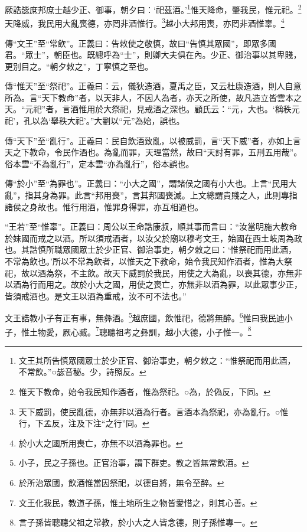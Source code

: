 厥誥毖庶邦庶士越少正、御事，朝夕曰：‘祀茲酒。’\footnote{文王其所告慎眾國眾士於少正官、御治事吏，朝夕敕之：“惟祭祀而用此酒，不常飲。”○毖音秘。少，詩照反。}惟天降命，肇我民，惟元祀。\footnote{惟天下教命，始令我民知作酒者，惟為祭祀。○為，於偽反，下同。}天降威，我民用大亂喪德，亦罔非酒惟行。\footnote{天下威罰，使民亂德，亦無非以酒為行者。言酒本為祭祀，亦為亂行。○惟行，下孟反，注及下注“之行”同。}越小大邦用喪，亦罔非酒惟辜。\footnote{於小大之國所用喪亡，亦無不以酒為罪也。}

{\noindent\zhuan{}\fzbyks 傳“文王”至“常飲”。正義曰：告敕使之敬慎，故曰“告慎其眾國”，即眾多國君。“眾士”，朝臣也。既總呼為“士”，則卿大夫俱在內。少正、御治事以其卑賤，更別目之。“朝夕敕之”，丁寧慎之至也。 \par}

{\noindent\zhuan{}\fzbyks 傳“惟天”至“祭祀”。正義曰：云，儀狄造酒，夏禹之臣，又云杜康造酒，則人自意所為。言“天下教命”者，以天非人，不因人為者，亦天之所使，故凡造立皆雲本之天。“元祀”者，言酒惟用於大祭祀，見戒酒之深也。顧氏云：“元，大也。‘稱秩元祀’，孔以為‘舉秩大祀’。”大劉以“元”為始，誤也。 \par}

{\noindent\zhuan{}\fzbyks 傳“天下”至“亂行”。正義曰：民自飲酒致亂，以被威罰，言“天下威”者，亦如上言天之下教命，令民作酒也。為亂而罪，天理當然，故曰“天討有罪，五刑五用哉”。俗本雲“不為亂行”，定本雲“亦為亂行”，俗本誤也。 \par}

{\noindent\zhuan{}\fzbyks 傳“於小”至“為罪也”。正義曰：“小大之國”，謂諸侯之國有小大也。上言“民用大亂”，指其身為罪。此言“邦用喪”，言其邦國喪滅。上文總謂貴賤之人，此則專指諸侯之身故也。惟行用酒，惟罪身得罪，亦互相通也。 \par}

{\noindent\shu{}\fzkt “王若”至“惟辜”。正義曰：周公以王命誥康叔，順其事而言曰：“汝當明施大教命於妹國而戒之以酒。所以須戒酒者，以汝父於廟以穆考文王，始國在西土岐周為政也。其誥慎所職眾國眾士於少正官、御治事吏，朝夕敕之曰：‘惟祭祀而用此酒，不常為飲也。’所以不常為飲者，以惟天之下教命，始令我民知作酒者，惟為大祭祀，故以酒為祭，不主飲。故天下威罰於我民，用使之大為亂，以喪其德，亦無非以酒為行而用之。故於小大之國，用使之喪亡，亦無非以酒為罪，以此眾事少正，皆須戒酒也。是文王以酒為重戒，汝不可不法也。” \par}

文王誥教小子有正有事，無彝酒。\footnote{小子，民之子孫也。正官治事，謂下群吏。教之皆無常飲酒。}越庶國，飲惟祀，德將無醉。\footnote{於所治眾國，飲酒惟當因祭祀，以德自將，無令至醉。}惟曰我民迪小子，惟土物愛，厥心臧。\footnote{文王化我民，教道子孫，惟土地所生之物皆愛惜之，則其心善。}聰聽祖考之彝訓，越小大德，小子惟一。\footnote{言子孫皆聰聽父祖之常教，於小大之人皆念德，則子孫惟專一。}


